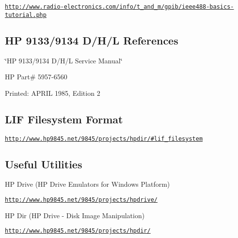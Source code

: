 \begin{DoxyItemize}
\item \href{http://www.radio-electronics.com/info/t_and_m/gpib/ieee488-basics-tutorial.php}{\tt http\-://www.\-radio-\/electronics.\-com/info/t\-\_\-and\-\_\-m/gpib/ieee488-\/basics-\/tutorial.\-php}
\end{DoxyItemize}

\subsection*{H\-P 9133/9134 D/\-H/\-L References}


\begin{DoxyItemize}
\item \char`\"{}\-H\-P 9133/9134 D/\-H/\-L Service Manual\char`\"{}
\item H\-P Part\# 5957-\/6560
\item Printed\-: A\-P\-R\-I\-L 1985, Edition 2
\end{DoxyItemize}

\subsection*{L\-I\-F Filesystem Format}


\begin{DoxyItemize}
\item \href{http://www.hp9845.net/9845/projects/hpdir/#lif_filesystem}{\tt http\-://www.\-hp9845.\-net/9845/projects/hpdir/\#lif\-\_\-filesystem}
\end{DoxyItemize}

\subsection*{Useful Utilities}


\begin{DoxyItemize}
\item H\-P Drive (H\-P Drive Emulators for Windows Platform)
\begin{DoxyItemize}
\item \href{http://www.hp9845.net/9845/projects/hpdrive/}{\tt http\-://www.\-hp9845.\-net/9845/projects/hpdrive/}
\end{DoxyItemize}
\item H\-P Dir (H\-P Drive -\/ Disk Image Manipulation)
\begin{DoxyItemize}
\item \href{http://www.hp9845.net/9845/projects/hpdir/}{\tt http\-://www.\-hp9845.\-net/9845/projects/hpdir/}
\end{DoxyItemize}
\end{DoxyItemize}





